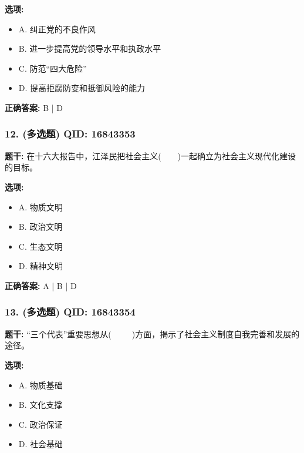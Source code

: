 \documentclass[12pt,UTF8]{ctexart}
\begin{document}
\textbf{选项:}
\begin{itemize}[leftmargin=*]

  \item A. 纠正党的不良作风

  \item B. 进一步提高党的领导水平和执政水平

  \item C. 防范“四大危险”

  \item D. 提高拒腐防变和抵御风险的能力

\end{itemize}

\textbf{正确答案:}
B | D

\vspace{0.3em}\hrulefill\vspace{0.7em}

\subsubsection*{12. (多选题) \small QID: 16843353}

\textbf{题干:}
在十六大报告中，江泽民把社会主义(    )一起确立为社会主义现代化建设的目标。

\textbf{选项:}
\begin{itemize}[leftmargin=*]

  \item A. 物质文明

  \item B. 政治文明

  \item C. 生态文明

  \item D. 精神文明

\end{itemize}

\textbf{正确答案:}
A | B | D

\vspace{0.3em}\hrulefill\vspace{0.7em}

\subsubsection*{13. (多选题) \small QID: 16843354}

\textbf{题干:}
“三个代表”重要思想从(     )方面，揭示了社会主义制度自我完善和发展的途径。

\textbf{选项:}
\begin{itemize}[leftmargin=*]

  \item A. 物质基础

  \item B. 文化支撑

  \item C. 政治保证

  \item D. 社会基础

\end{itemize}
\end{document}
